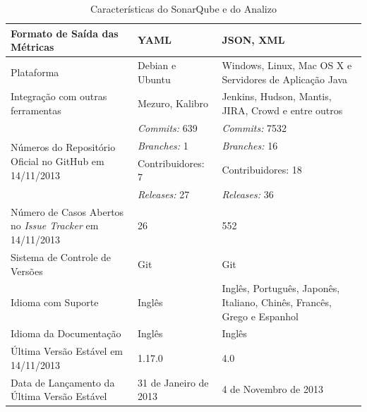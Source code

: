 \begin{savenotes}
\begin{table}[!ht]
\begin{tabular}{|p{5cm}|p{4.5cm}|p{5cm}|}
Formato de Saída das Métricas  & YAML & JSON, XML \\ \hline

Plataforma  & Debian e Ubuntu & Windows, Linux, Mac OS X e Servidores de Aplicação Java                                                                                              \\ \hline

Integração com outras ferramentas & Mezuro, Kalibro & Jenkins, Hudson, Mantis, JIRA, Crowd e entre outros \\ \hline

\multirow{4}{5cm}{Números do Repositório Oficial no GitHub em 14/11/2013}
& \textit{Commits:} 639  & \textit{Commits:} 7532\\ \cline{2-3} 

&\textit{Branches:} 1 & \textit{Branches:} 16  \\ \cline{2-3} 
& Contribuidores: 7 & Contribuidores: 18 \\ \cline{2-3} 
& \textit{Releases:} 27  & \textit{Releases:} 36

 \\ \hline

Número de Casos Abertos no \textit{Issue Tracker} em 14/11/2013 & 26  & 552  
\\ \hline

Sistema de Controle de Versões & Git & Git \\ \hline

Idioma com Suporte & Inglês & Inglês, Português, Japonês, Italiano, Chinês, Francês, Grego e Espanhol \\ \hline

Idioma da Documentação & Inglês & Inglês

\\ \hline
Última Versão Estável em 14/11/2013 & 1.17.0 & 4.0  

\\ \hline
Data de Lançamento da Última Versão Estável & 31 de Janeiro de 2013 & 4 de Novembro de 2013

\\ \hline
\end{tabular}
\caption{Características do SonarQube e do Analizo}
\label{dados-ferramentas-estatica}
\end{table}
\FloatBarrier
\end{savenotes}


